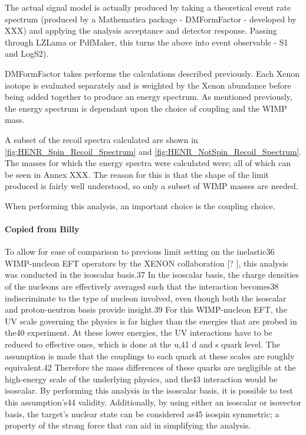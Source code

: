 \par
The actual signal model is actually produced by taking a theoretical event rate spectrum (produced by a Mathematica package - DMFormFactor - developed by XXX) and applying the analysis acceptance and detector response.
Passing through LZLama or PdfMaker, this turns the above into event observable - S1 and LogS2).
\par
DMFormFactor takes performs the calculations described previously.
Each Xenon isotope is evaluated separately and is weighted by the Xenon abundance before being added together to produce an energy spectrum.
As mentioned previously, the energy spectrum is dependant upon the choice of coupling and the WIMP mass.


\par
A subset of the recoil spectra calculated are shown in \autoref{fig:HENR_Spin_Recoil_Spectrum} and \autoref{fig:HENR_NotSpin_Recoil_Spectrum}.
The masses for which the energy spectra were calculated were;
all of which can be seen in Annex XXX.
The reason for this is that the shape of the limit produced is fairly well understood, so only a subset of WIMP masses are needed.



\par
When performing this analysis, an important choice is the coupling choice.


\paragraph{Copied from Billy}
\par
To allow for ease of comparison to previous limit setting on the inelastic36
WIMP-nucleon EFT operators by the XENON collaboration [? ], this analysis was conducted in the isoscalar basis.37
In the isoscalar basis, the charge densities of the nucleons are effectively averaged such that the interaction becomes38
indiscriminate to the type of nucleon involved, even though both the isoscalar and proton-neutron basis provide insight.39
For this WIMP-nucleon EFT, the UV scale governing the physics is far higher than the energies that are probed in the40
experiment. At these lower energies, the UV interactions have to be reduced to effective ones, which is done at the u,41
d and s quark level. The assumption is made that the couplings to each quark at these scales are roughly equivalent.42
Therefore the mass differences of these quarks are negligible at the high-energy scale of the underlying physics, and the43
interaction would be isoscalar. By performing this analysis in the isoscalar basis, it is possible to test this assumption’s44
validity. Additionally, by using either an isoscalar or isovector basis, the target’s nuclear state can be considered as45
isospin symmetric; a property of the strong force that can aid in simplifying the analysis.


